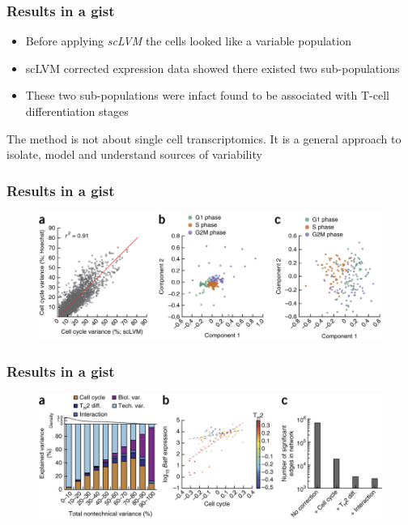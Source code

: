 \documentclass[10pt, compress]{beamer}
\renewcommand{\(}{\begin{columns}}
\renewcommand{\)}{\end{columns}}
\newcommand{\<}[1]{\begin{column}{#1}}
\renewcommand{\>}{\end{column}}
\begin{document}
\begin{frame}
\frametitle{Results in a gist}
\begin{itemize}
\item Before applying \textit{scLVM} the cells looked like a variable population
\item scLVM corrected expression data showed there existed two sub-populations
\item These two sub-populations were infact found to be associated with T-cell differentiation stages
\end{itemize}
The method is not about single cell transcriptomics. It is a general approach to isolate, model and understand sources of variability
\end{frame}

\begin{frame}
\frametitle{Results in a gist}
\begin{figure}
\includegraphics[width=0.8\linewidth]{images/results1.jpg}
\caption{}
\end{figure}
\end{frame}

\begin{frame}
\frametitle{Results in a gist}
\begin{figure}
\includegraphics[width=0.8\linewidth]{images/variation.jpg}
\caption{}
\end{figure}
\end{frame}
\end{document}
